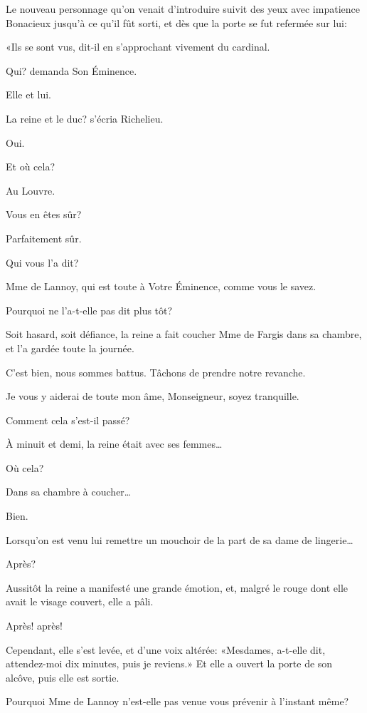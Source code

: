 Le nouveau personnage qu'on venait d'introduire suivit des yeux avec impatience Bonacieux jusqu'à ce qu'il fût sorti, et dès que la porte se fut refermée sur lui: 

«Ils se sont vus, dit-il en s'approchant vivement du cardinal. 

\speak  Qui? demanda Son Éminence. 

\speak  Elle et lui. 

\speak  La reine et le duc? s'écria Richelieu. 

\speak  Oui. 

\speak  Et où cela? 

\speak  Au Louvre. 

\speak  Vous en êtes sûr? 

\speak  Parfaitement sûr. 

\speak  Qui vous l'a dit? 

\speak  Mme de Lannoy, qui est toute à Votre Éminence, comme vous le savez. 

\speak  Pourquoi ne l'a-t-elle pas dit plus tôt? 

\speak  Soit hasard, soit défiance, la reine a fait coucher Mme de Fargis dans sa chambre, et l'a gardée toute la journée. 

\speak  C'est bien, nous sommes battus. Tâchons de prendre notre revanche. 

\speak  Je vous y aiderai de toute mon âme, Monseigneur, soyez tranquille. 

\speak  Comment cela s'est-il passé? 

\speak  À minuit et demi, la reine était avec ses femmes\dots 

\speak  Où cela? 

\speak  Dans sa chambre à coucher\dots 

\speak  Bien. 

\speak  Lorsqu'on est venu lui remettre un mouchoir de la part de sa dame de lingerie\dots 

\speak  Après? 

\speak  Aussitôt la reine a manifesté une grande émotion, et, malgré le rouge dont elle avait le visage couvert, elle a pâli. 

\speak  Après! après! 

\speak  Cependant, elle s'est levée, et d'une voix altérée: «Mesdames, a-t-elle dit, attendez-moi dix minutes, puis je reviens.» Et elle a ouvert la porte de son alcôve, puis elle est sortie. 

\speak  Pourquoi Mme de Lannoy n'est-elle pas venue vous prévenir à l'instant même? 

